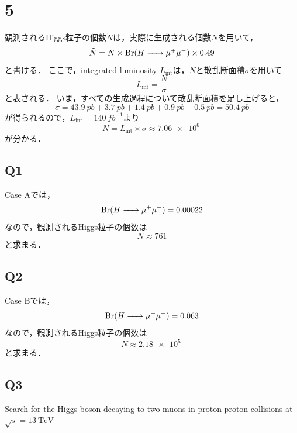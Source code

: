 \documentclass[a4paper,11pt]{jsarticle}
\begin{document}
\section*{5}
観測されるHiggs粒子の個数$\tilde{N}$は，実際に生成される個数$N$を用いて，
\begin{equation}
  \tilde{N} = N\times \mathrm{Br}(H \ce{->} \mu^+\mu^-)\times 0.49
\end{equation}
と書ける．
ここで，integrated luminosity $L_{\mathrm{int}}$は，$N$と散乱断面積$\sigma$を用いて
\begin{equation}
  L_{\mathrm{int}} = \frac{N}{\sigma}
\end{equation}
と表される．
いま，すべての生成過程について散乱断面積を足し上げると，
\begin{equation}
  \sigma = \SI{43.9}{pb} + \SI{3.7}{pb} + \SI{1.4}{pb} + \SI{0.9}{pb} + \SI{0.5}{pb} = \SI{50.4}{pb}
\end{equation}
が得られるので，$L_{\mathrm{int}}=\SI{140}{fb^{-1}}$より
\begin{equation}
  N = L_{\mathrm{int}}\times\sigma \approx \SI{7.06e6}{}
\end{equation}
が分かる．

\subsection*{Q1}
Case Aでは，
\begin{equation}
  \mathrm{Br}(H \ce{->} \mu^+\mu^-) = 0.00022
\end{equation}
なので，観測されるHiggs粒子の個数は
\begin{equation}
  N \approx 761
\end{equation}
と求まる．

\subsection*{Q2}
Case Bでは，
\begin{equation}
  \mathrm{Br}(H \ce{->} \mu^+\mu^-) = 0.063
\end{equation}
なので，観測されるHiggs粒子の個数は
\begin{equation}
  N \approx \SI{2.18e5}{}
\end{equation}
と求まる．

\subsection*{Q3}
Search for the Higgs boson decaying to two muons in proton-proton collisions at $ \sqrt{s} = \SI{13}{\TeV}$
\end{document}
